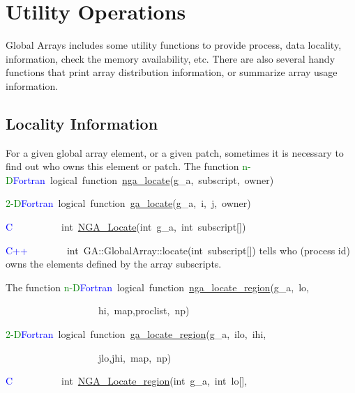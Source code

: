 \chapter{Utility Operations}

Global Arrays includes some utility functions to provide process,
data locality, information, check the memory availability, etc. There
are also several handy functions that print array distribution information,
or summarize array usage information. 


\section{Locality Information}

For a given global array element, or a given patch, sometimes it is
necessary to find out who owns this element or patch. The function
\textcolor{green}{n-D}\textcolor{blue}{Fortran}~logical~function~\href{http://www.emsl.pnl.gov/docs/global/ga_ops.html\#ga_locate}{nga\_{}locate}(g\_a,~subscript,~owner)~

\textcolor{green}{2-D}\textcolor{blue}{Fortran}~logical~function~\href{http://www.emsl.pnl.gov/docs/global/ga_ops.html\#ga_locate}{ga\_{}locate}(g\_a,~i,~j,~owner)~

\textcolor{blue}{C}~~~~~~~~~~int~\href{http://www.emsl.pnl.gov/docs/global/c_nga_ops.html\#ga_locate}{NGA\_{}Locate}(int~g\_a,~int~subscript{[}{]})~

\textcolor{blue}{C++}~~~~~~~~int~GA::GlobalArray::locate(int~subscript{[}{]})
tells who (process id) owns the elements defined by the array subscripts.

The function
\textcolor{green}{n-D}\textcolor{blue}{Fortran}~logical~function~\href{http://www.emsl.pnl.gov/docs/global/ga_ops.html\#ga_locate_region}{nga\_{}locate\_{}region}(g\_a,~lo,~

~~~~~~~~~~~~~~~~~~~hi,~map,proclist,~np)~

\textcolor{green}{2-D}\textcolor{blue}{Fortran}~logical~function~\href{http://www.emsl.pnl.gov/docs/global/c_nga_ops.html\#ga_locate_region}{ga\_{}locate\_{}region}(g\_a,~ilo,~ihi,~

~~~~~~~~~~~~~~~~~~~jlo,jhi,~map,~np)~

\textcolor{blue}{C}~~~~~~~~~~int~\href{http://www.emsl.pnl.gov/docs/global/c_nga_ops.html\#ga_locate_region}{NGA\_{}Locate\_{}region}(int~g\_a,~int~lo{[}{]},~

